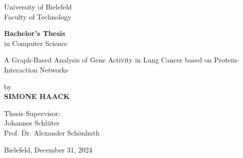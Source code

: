 \documentclass[11pt,a4paper]{article}
\begin{document}
\begin{titlepage}
  \begin{center}
    \vspace*{\fill}
    \LARGE{University of Bielefeld}\\
    \Large{Faculty of Technology}
    \vspace{2cm}

    \textbf{Bachelor's Thesis}\\
    in Computer Science
    \vspace{2cm}

    \Huge{A Graph-Based Analysis of Gene Activity in Lung Cancer based on Protein-Interaction Networks}\\
    \vspace{1cm}

    \large{by} \\
    \textbf{SIMONE HAACK}\\
    \vspace{2cm}

    Thesis Supervisor:\\
    Johannes Schlüter\\
    Prof. Dr. Alexander Schönhuth\\
    \vspace{2cm}

    Bielefeld, December 31, 2024
    \vspace*{\fill}

  \end{center}
\end{titlepage}

\tableofcontents
\newpage
















\newpage

\end{document}
